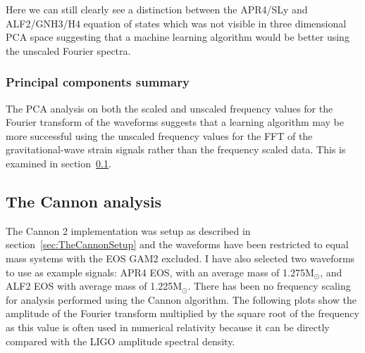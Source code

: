 Here we can still clearly see a distinction between the APR4/SLy and ALF2/GNH3/H4 equation of states which was not visible in three dimensional PCA space suggesting that a machine learning algorithm would be better using the unscaled Fourier spectra. 
\subsubsection{Principal components summary}
The PCA analysis on both the scaled and unscaled frequency values for the Fourier transform of the waveforms suggests that a learning algorithm may be more successful using the unscaled frequency values for the FFT of the gravitational-wave strain signals rather than the frequency scaled data. This is examined in section~\ref{sec:TheCannon}.

\subsection{The Cannon analysis}
\label{sec:TheCannon}
The Cannon 2 implementation was setup as described in section~\ref{sec:TheCannonSetup} and the waveforms have been restricted to equal mass systems with the EOS GAM2 excluded. I have also selected two waveforms to use as example signals: APR4 EOS, with an average mass of 1.275M$_\odot$, and ALF2 EOS with average mass of 1.225M$_\odot$. There has been no frequency scaling for analysis performed using the Cannon algorithm. The following plots show the amplitude of the Fourier transform multiplied by the square root of the frequency as this value is often used in numerical relativity \citep[eg][]{Clark2015, Takami2015} because it can be directly compared with the LIGO amplitude spectral density. 
